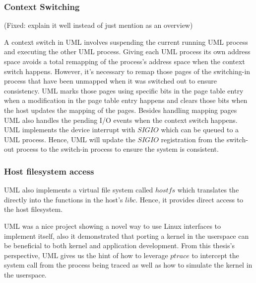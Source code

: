\subsubsection{Context Switching}

(Fixed: explain it well instead of just mention as an overview)

A context switch in UML involves suspending the current running UML process and executing the other UML process. Giving each UML process its own address space avoids a total remapping of the process's address space when the context switch happens. However, it's necessary to remap those pages of the switching-in process that have been unmapped when it was switched out to ensure consistency. UML marks those pages using specific bits in the page table entry when a modification in the page table entry happens and clears those bits when the host updates the mapping of the pages. Besides handling mapping pages UML also handles the pending I/O events when the context switch happens. UML implements the device interrupt with $SIGIO$ which can be queued to a UML process. Hence, UML will update the $SIGIO$ registration from the switch-out process to the switch-in process to ensure the system is consistent.        

\subsubsection{Host filesystem access}

UML also implements a virtual file system called $hostfs$ which translates the directly into the functions in the host's $libc$. Hence, it provides direct access to the host filesystem.

UML was a nice project showing a novel way to use Linux interfaces to implement itself, also it demonstrated that porting a kernel in the userspace can be beneficial to both kernel and application development. From this thesis's perspective, UML gives us the hint of how to leverage $ptrace$ to intercept the system call from the process being traced as well as how to simulate the kernel in the userspace.




